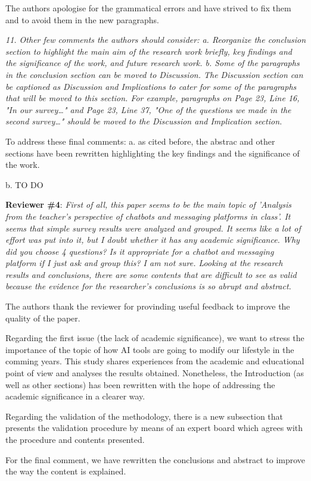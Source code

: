 \documentclass{letter}
\begin{document}
The authors apologise for the grammatical errors and have strived to fix them and to avoid them in the new paragraphs.

{\it 11.     Other few comments the authors should consider:
   a.   Reorganize the conclusion section to highlight the main aim of the research work briefly, key findings and the significance of the work, and future research work.
   b.   Some of the paragraphs in the conclusion section can be moved to Discussion. The Discussion section can be captioned as Discussion and Implications to cater for some of the paragraphs that will be moved to this section. For example, paragraphs on Page 23, Line 16, "In our survey…" and Page 23, Line 37, "One of the questions we made in the second survey…" should be moved to the Discussion and Implication section.}

To address these final comments:
    a. as cited before, the abstrac and other sections have been rewritten highlighting the key findings and the significance of the work.

    b. TO DO


{\bf Reviewer \#4}: {\it First of all, this paper seems to be the main topic of 'Analysis from the teacher's perspective of chatbots and messaging platforms in class'.
It seems that simple survey results were analyzed and grouped.
It seems like a lot of effort was put into it, but I doubt whether it has any academic significance.
Why did you choose 4 questions? Is it appropriate for a chatbot and messaging platform if I just ask and group this? I am not sure.
Looking at the research results and conclusions, there are some contents that are difficult to see as valid because the evidence for the researcher's conclusions is so abrupt and abstract.}

The authors thank the reviewer for provinding useful feedback to improve the quality of the paper. 

Regarding the first issue (the lack of academic significance), we want to stress the importance of the topic of how AI tools are going to modify our lifestyle in the comming years. This study shares experiences from the academic and educational point of view and analyses the results obtained. Nonetheless, the Introduction (as well as other sections) has been rewritten with the hope of addressing the academic significance in a clearer way.

Regarding the validation of the methodology, there is a new subsection that presents the validation procedure by means of an expert board which agrees with the procedure and contents presented.

For the final comment, we have rewritten the conclusions and abstract to improve the way the content is explained.
\end{document}
